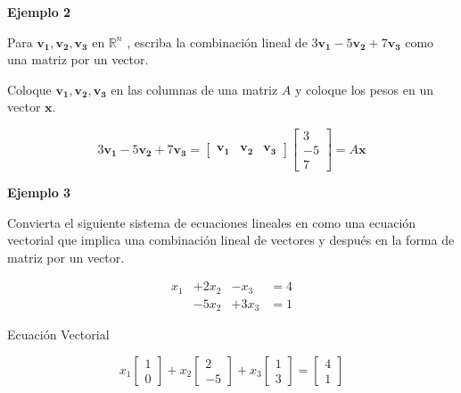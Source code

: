\documentclass{article}
\begin{document}
\begin{large}
    \textbf{Ejemplo 2}
\end{large}

Para $\mathbf{v_1}, \mathbf{v_2}, \mathbf{v_3}$ en $\mathbb{R}^n$ , escriba la combinación lineal de $3\mathbf{v_1} - 5\mathbf{v_2} + 7\mathbf{v_3}$ como una matriz por un vector.

Coloque $\mathbf{v_1}, \mathbf{v_2}, \mathbf{v_3}$ en las columnas de una matriz $A$ y coloque los pesos en un vector $\mathbf{x}$.

\begin{equation*}
    3\mathbf{v_1} - 5\mathbf{v_2} + 7\mathbf{v_3} = \begin{bmatrix}
        \mathbf{v_1} & \mathbf{v_2} & \mathbf{v_3}
    \end{bmatrix}
    \begin{bmatrix}
        3 \\-5\\7
    \end{bmatrix}
    = A\mathbf{x}
\end{equation*}

\begin{large}
    \textbf{Ejemplo 3}
\end{large}

Convierta el siguiente sistema de ecuaciones lineales en como una ecuación vectorial que implica una combinación lineal de vectores y después en la forma de matriz por un vector.

\begin{equation*}
    \begin{aligned}
        x_1 &+ 2x_2 &- x_3 &= 4\\
            &-5x_2  &+3x_3 &= 1
    \end{aligned}
\end{equation*}

Ecuación Vectorial

\begin{equation*}
    x_1\begin{bmatrix} 1\\0 \end{bmatrix} 
    +x_2\begin{bmatrix} 2\\-5 \end{bmatrix}
    +x_3\begin{bmatrix} 1\\3 \end{bmatrix}
    =\begin{bmatrix} 4\\1 \end{bmatrix}
\end{equation*}
\end{document}
